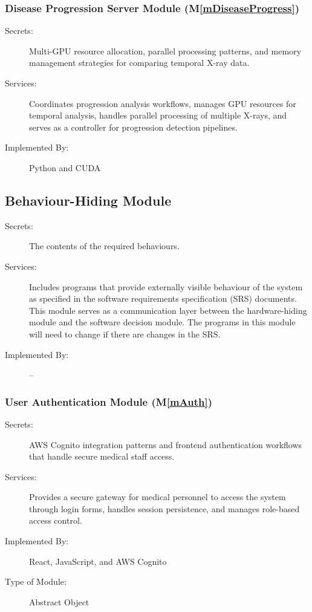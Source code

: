 \documentclass[12pt, titlepage]{article}
\newcommand{\mref}[1]{M\ref{#1}}
\begin{document}
\subsubsection{Disease Progression Server Module (\mref{mDiseaseProgress})}
\begin{description}
\item[Secrets:] Multi-GPU resource allocation, parallel processing patterns, and memory management strategies for comparing temporal X-ray data.
\item[Services:] Coordinates progression analysis workflows, manages GPU resources for temporal analysis, handles parallel processing of multiple X-rays, and serves as a controller for progression detection pipelines.
\item[Implemented By:] Python and CUDA
\end{description}

\subsection{Behaviour-Hiding Module}

\begin{description}
\item[Secrets:]The contents of the required behaviours.
\item[Services:]Includes programs that provide externally visible behaviour of
  the system as specified in the software requirements specification (SRS)
  documents. This module serves as a communication layer between the
  hardware-hiding module and the software decision module. The programs in this
  module will need to change if there are changes in the SRS.
\item[Implemented By:] --
\end{description}

\subsubsection{User Authentication Module (\mref{mAuth})}
\begin{description}
\item[Secrets:] AWS Cognito integration patterns and frontend authentication workflows that handle secure medical staff access.
\item[Services:] Provides a secure gateway for medical personnel to access the system through login forms, handles session persistence, and manages role-based access control.
\item[Implemented By:] React, JavaScript, and AWS Cognito
\item[Type of Module:] Abstract Object
\end{description}
\end{document}
